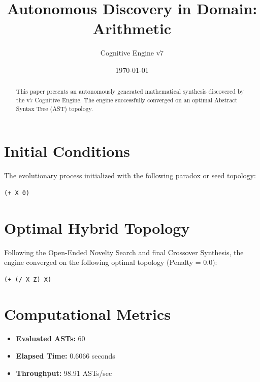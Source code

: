 \documentclass{article}
\title{Autonomous Discovery in Domain: Arithmetic}
\author{Cognitive Engine v7}
\date{\today}
\begin{document}
\maketitle
\begin{abstract}
This paper presents an autonomously generated mathematical synthesis discovered by the v7 Cognitive Engine. The engine successfully converged on an optimal Abstract Syntax Tree (AST) topology.\end{abstract}
\section{Initial Conditions}
The evolutionary process initialized with the following paradox or seed topology:
\begin{verbatim}
(+ X 0)
\end{verbatim}
\section{Optimal Hybrid Topology}
Following the Open-Ended Novelty Search and final Crossover Synthesis, the engine converged on the following optimal topology (Penalty = 0.0):
\begin{verbatim}
(+ (/ X Z) X)
\end{verbatim}
\section{Computational Metrics}
\begin{itemize}
  \item \textbf{Evaluated ASTs:} 60
  \item \textbf{Elapsed Time:} 0.6066 seconds
  \item \textbf{Throughput:} 98.91 ASTs/sec
\end{itemize}
\end{document}
